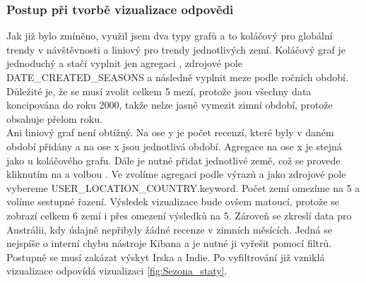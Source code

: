 \documentclass[czech,BP]{thesiskiv}
\begin{document}
\subsubsection{Postup při tvorbě vizualizace odpovědi}
Jak již bylo zmíněno, využil jsem dva typy grafů a to koláčový pro globální trendy v návštěvnosti a liniový pro trendy jednotlivých zemí. Koláčový graf je jednoduchý a stačí vyplnit jen agregaci , zdrojové pole DATE\_CREATED\_SEASONS a následně vyplnit meze podle ročních období. Důležité je, že se musí zvolit celkem 5 mezí, protože jsou všechny data koncipována do roku 2000, takže nelze jasně vymezit zimní období, protože obsahuje přelom roku.
\\
Ani liniový graf není obtížný. Na ose y je počet recenzí, které byly v daném období přidány a na ose x jsou jednotlivá období. Agregace na ose x je stejná jako u koláčového grafu. Dále je nutné přidat jednotlivé země, což se provede kliknutím na  a volbou . Ve  zvolíme agregaci podle výrazů a jako zdrojové pole vybereme USER\_LOCATION\_COUNTRY.keyword. Počet zemí omezíme na 5 a volíme sestupné řazení. Výsledek vizualizace bude ovšem matoucí, protože se zobrazí celkem 6 zemí i přes omezení výsledků na 5. Zároveň se zkreslí data pro Austrálii, kdy údajně nepřibyly žádné recenze v zimních měsících. Jedná se nejspíše o interní chybu nástroje Kibana a je nutné ji vyřešit pomocí filtrů. Postupně se musí zakázat výskyt Irska a Indie. Po vyfiltrování již vzniklá vizualizace odpovídá vizualizaci \ref{fig:Sezona_staty}.
\end{document}
